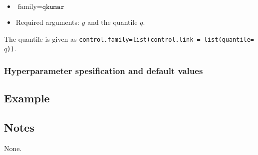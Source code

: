 \documentclass[a4paper,11pt]{article}
\begin{document}
\begin{itemize}
\item $\text{family}=\texttt{qkumar}$
\item Required arguments: $y$ and the quantile $q$. 
\end{itemize}
The quantile is given as \texttt{control.family=list(control.link = list(quantile=$q$))}.

\subsubsection*{Hyperparameter spesification and default values}




\subsection*{Example}



\subsection*{Notes}

None.
\end{document}
